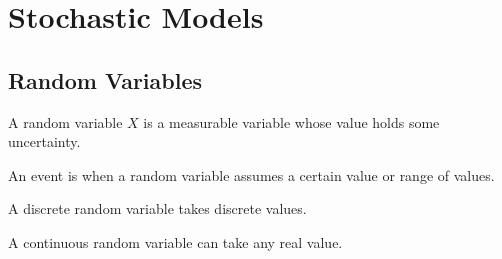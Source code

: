 \documentclass{article}
\begin{document}
\section{Stochastic Models}
\subsection{Random Variables}
\begin{definition}
    A random variable \(X\) is a measurable variable whose value holds some uncertainty.
\end{definition}
An event is when a random variable assumes a certain value or range of values.
\begin{definition}
    A discrete random variable takes discrete values.
\end{definition}
\begin{definition}
    A continuous random variable can take any real value.
\end{definition}
\end{document}
